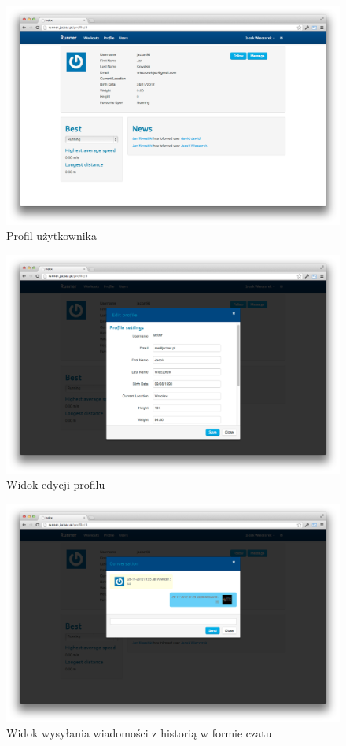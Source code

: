 \begin{figure}[ht]
	\centering
		\includegraphics[width=1\linewidth]{assets/profil.png}
	\caption{Profil użytkownika}
	\label{fig:profil}
\end{figure}


\begin{figure}[ht]
	\centering
		\includegraphics[width=1\linewidth]{assets/edit.png}
	\caption{Widok edycji profilu}
	\label{fig:add_workout}
\end{figure}

\begin{figure}[ht]
	\centering
		\includegraphics[width=1\linewidth]{assets/chat.png}
	\caption{Widok wysyłania wiadomości z historią w formie czatu}
	\label{fig:add_workout}
\end{figure}
